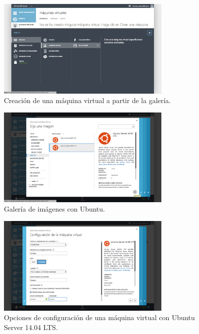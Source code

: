 \documentclass{article}
\begin{document}
\begin{figure}[h]
  \centering
    \includegraphics[width=0.75\textwidth]{img/m_p001.png}
  \caption{Creación de una máquina virtual a partir de la galería.}
  \label{fig:VirtualMachineCreate}
\end{figure}

\begin{figure}[h]
  \centering
    \includegraphics[width=0.75\textwidth]{img/m_p002.png}
  \caption{Galería de imágenes con Ubuntu.}
  \label{fig:VirtualMachineChooseUbuntuServer}
\end{figure}

\begin{figure}[h]
  \centering
    \includegraphics[width=0.75\textwidth]{img/m_p003.png}
  \caption{Opciones de configuración de una máquina virtual con Ubuntu Server 14.04 LTS.}
  \label{fig:VirtualMachineConfigUbuntuServer}
\end{figure}
\end{document}
